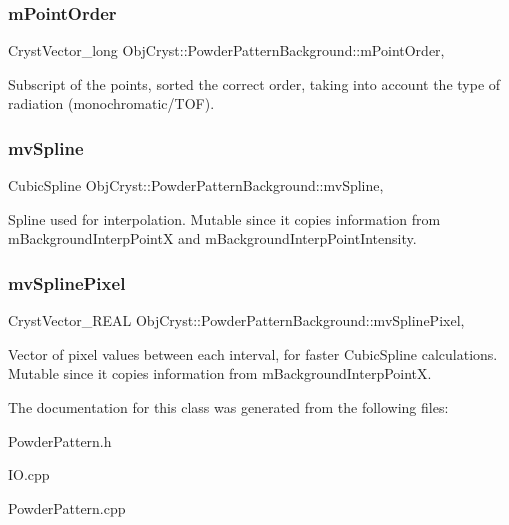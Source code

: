 \subsubsection{\texorpdfstring{mPointOrder}{mPointOrder}}
{\footnotesize\ttfamily Cryst\+Vector\+\_\+long Obj\+Cryst\+::\+Powder\+Pattern\+Background\+::m\+Point\+Order\hspace{0.3cm}{\ttfamily [mutable]}, {\ttfamily [protected]}}

Subscript of the points, sorted the correct order, taking into account the type of radiation (monochromatic/\+T\+OF). \mbox{\label{class_obj_cryst_1_1_powder_pattern_background_a671b5004d363af3cd7efbe97b488ac33}} 
\subsubsection{\texorpdfstring{mvSpline}{mvSpline}}
{\footnotesize\ttfamily Cubic\+Spline Obj\+Cryst\+::\+Powder\+Pattern\+Background\+::mv\+Spline\hspace{0.3cm}{\ttfamily [mutable]}, {\ttfamily [protected]}}

Spline used for interpolation. Mutable since it copies information from m\+Background\+Interp\+PointX and m\+Background\+Interp\+Point\+Intensity. \mbox{\label{class_obj_cryst_1_1_powder_pattern_background_a16f3af868232f0bbe8c4884ec1676518}} 
\subsubsection{\texorpdfstring{mvSplinePixel}{mvSplinePixel}}
{\footnotesize\ttfamily Cryst\+Vector\+\_\+\+R\+E\+AL Obj\+Cryst\+::\+Powder\+Pattern\+Background\+::mv\+Spline\+Pixel\hspace{0.3cm}{\ttfamily [mutable]}, {\ttfamily [protected]}}

Vector of pixel values between each interval, for faster Cubic\+Spline calculations. Mutable since it copies information from m\+Background\+Interp\+PointX. 

The documentation for this class was generated from the following files\+:\begin{DoxyCompactItemize}
\item 
Powder\+Pattern.\+h\item 
I\+O.\+cpp\item 
Powder\+Pattern.\+cpp\end{DoxyCompactItemize}
